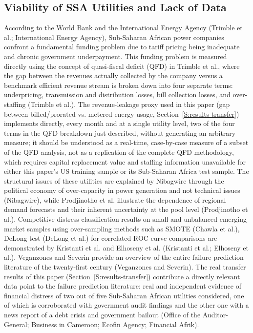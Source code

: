 \documentclass[final,1p,times]{elsarticle}
\begin{document}
\subsection{Viability of SSA Utilities and Lack of Data}

According to the World Bank and the International Energy Agency (Trimble et al.; International Energy Agency), Sub-Saharan African power companies confront a fundamental funding problem due to tariff pricing being inadequate and chronic government underpayment. This funding problem is measured directly using the concept of quasi-fiscal deficit (QFD) in Trimble et al., where the gap between the revenues actually collected by the company versus a benchmark efficient revenue stream is broken down into four separate terms: underpricing, transmission and distribution losses, bill collection losses, and over-staffing (Trimble et al.). The revenue-leakage proxy used in this paper (gap between billed/prorated vs. metered energy usage, Section~\ref{S:results-transfer}) implements directly, every month and at a single utility level, two of the four terms in the QFD breakdown just described, without generating an arbitrary measure; it should be understood as a real-time, case-by-case measure of a subset of the QFD analysis, not as a replication of the complete QFD methodology, which requires capital replacement value and staffing information unavailable for either this paper's US training sample or its Sub-Saharan Africa test sample. The structural issues of these utilities are explained by Nibagwire through the political economy of over-capacity in power generation and not technical issues (Nibagwire), while Prodjinotho et al. illustrate the dependence of regional demand forecasts and their inherent uncertainty at the pool level (Prodjinotho et al.). Competitive distress classification results on small and unbalanced emerging market samples using over-sampling methods such as SMOTE (Chawla et al.), DeLong test (DeLong et al.) for correlated ROC curve comparisons are demonstrated by Kristanti et al. and Elhoseny et al. (Kristanti et al.; Elhoseny et al.). Veganzones and Severin provide an overview of the entire failure prediction literature of the twenty-first century (Veganzones and Severin). The real transfer results of this paper (Section~\ref{S:results-transfer}) contribute a directly relevant data point to the failure prediction literature: real and independent evidence of financial distress of two out of five Sub-Saharan African utilities considered, one of which is corroborated with government audit findings and the other one with a news report of a debt crisis and government bailout (Office of the Auditor-General; Business in Cameroon; Ecofin Agency; Financial Afrik).
\end{document}

